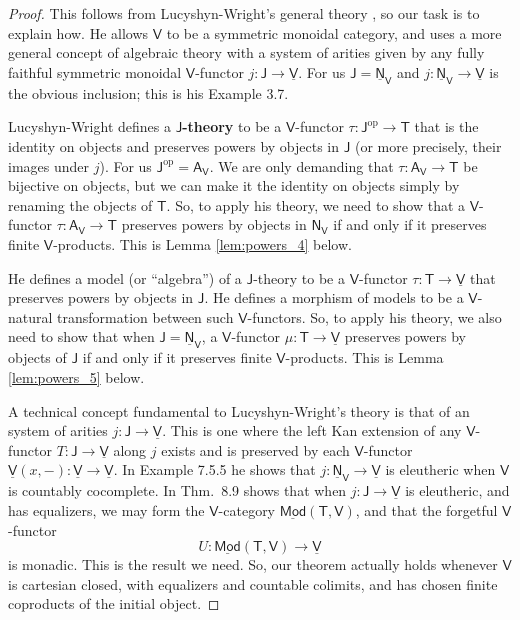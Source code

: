 \documentclass{amsart}
\newcommand{\define}[1]{{\bf \boldmath{#1}}}
\theoremstyle{definition}
\newcommand{\Mod}{\mathsf{Mod}}
\newcommand{\NN}{\mathsf{N}}
\newcommand{\A}{\mathsf{A}}
\newcommand{\V}{\mathsf{V}}
\newcommand{\J}{\mathsf{J}}
\newcommand{\T}{\mathsf{T}}
\newcommand{\op}{\mathrm{op}}
\newcommand{\maps}{\colon}
\begin{document}
\begin{proof}
This follows from Lucyshyn-Wright's general theory \cite{lucyshyn-wright}, so our task is
to explain how.   He allows $\V$ to be a symmetric monoidal category, and uses a more general concept of algebraic theory with a system of arities given by any fully faithful symmetric monoidal $\V$-functor $j \maps \J \to \underline{\V}$.   For us $\J = \underline{\NN}_\V$ and $j \maps \underline{\NN}_\V \to \underline{\V}$ is the obvious inclusion; this is his Example 3.7.

Lucyshyn-Wright defines a \textbf{$\J$-theory} to be a $\V$-functor $\tau \maps \J^\op \to \T$ that is the identity on objects and preserves powers by objects in $\J$ (or more precisely, their images under $j$).  For us $\J^\op = \A_\V$.   We are only demanding that $\tau \maps \A_\V \to \T$ be bijective on objects, but we can make it the identity on objects simply by renaming the objects of $\T$.  So, to apply his theory, we need to show that a $\V$-functor $\tau \maps \A_\V \to \T$ preserves powers by objects in $\NN_\V$ if and only if it preserves finite $\V$-products.  This is Lemma \ref{lem:powers_4} below.

He defines a model (or ``algebra'') of a $\J$-theory to be a $\V$-functor $\tau \maps \T \to \underline{\V}$ that preserves powers by objects in $\J$.   He defines a morphism of models to be a $\V$-natural transformation between such $\V$-functors.  So, to apply his theory, we also need to show that when $\J = \underline{\NN}_\V$, a $\V$-functor $\mu \maps \T \to \underline{\V}$ preserves powers by objects of $\J$ if and only if it preserves finite $\V$-products.   This is Lemma \ref{lem:powers_5} below.

A technical concept fundamental to Lucyshyn-Wright's theory is that of an \define{eleutheric} system of arities $j \maps \J \to \underline{\V}$.  This is one where the left Kan extension of any $\V$-functor $T \maps \J \to \underline{\V}$ along $j$ exists and is preserved by each $\V$-functor
$\underline{\V}(x,-) \maps \underline{\V} \to \underline{\V}$.  In Example 7.5.5 he shows
that $j \maps \underline{\NN}_\V \to \underline{\V}$ is eleutheric when $\V$ is 
countably cocomplete.  In Thm.\ 8.9 shows that when $j \maps \J \to \underline{\V}$ is eleutheric, and has equalizers, we may form the $\V$-category $\underline{\Mod}(\T,\V)$, and that the forgetful $\V$-functor
\[   U \maps \underline{\Mod}(\T,\V) \to \underline{\V} \]
is monadic.  This is the result we need.   So, our theorem actually holds whenever $\V$ is cartesian closed, with equalizers and countable colimits, and has chosen finite coproducts of the initial object.  \end{proof}
\end{document}
